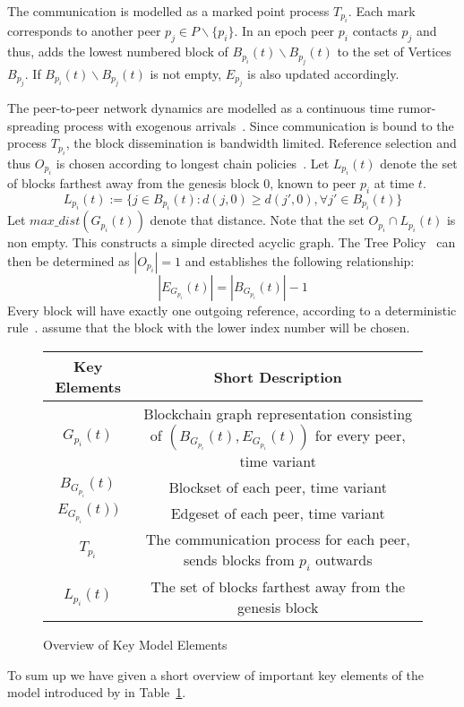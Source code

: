 The communication is modelled as a marked point process $T_{p_i}$.
Each mark corresponds to another peer $p_j \in P\backslash \{p_i\}$.
In an epoch peer $p_i$ contacts $p_j$ and thus, adds the lowest numbered block of $B_{p_i}(t)\backslash B_{p_j}(t)$ to the set of Vertices $B_{p_j}$. If $B_{p_i}(t)\backslash B_{p_j}(t)$ is not empty, $E_{p_j}$ is also updated accordingly.

The peer-to-peer network dynamics are modelled as a continuous time rumor-spreading process with exogenous arrivals~\citep{gopalan}. Since communication is bound to the process $T_{p_i}$, the block dissemination is bandwidth limited.
Reference selection and thus $O_{p_i}$ is chosen according to longest chain policies~\citep{gopalan}.
Let $L_{p_i}(t)$ denote the set of blocks farthest away from the genesis block $0$, known to peer $p_i$ at time $t$.
\begin{equation}
L_{p_i}(t) := \{j \in B_{p_i}(t): d(j,0)\geq d(j',0), \forall j' \in B_{p_i}(t) \}
\label{policy}
\end{equation}
Let $max\_ dist(G_{p_i}(t))$ denote that distance.
Note that the set $O_{p_i} \cap L_{p_i}(t)$ is non empty. This constructs a simple directed acyclic graph. The Tree Policy~\citep{gopalan} can then be determined as $|O_{p_i}|=1$ and establishes the following relationship:
\begin{equation}
|E_{G_{p_i}}(t)| = |B_{G_{p_i}}(t)| -1
\end{equation}
Every block will have exactly one outgoing reference, according to a deterministic rule~\citep{gopalan}. \citeauthor{gopalan} assume that the block with the lower index number will be chosen.

\begin{figure}[t]
\centering
{\renewcommand{\arraystretch}{1.5}
	\begin{tabular}{|c|c|}
	\hline
	\textbf{Key Elements}		&\textbf{Short Description}\\
	\hline
	$G_{p_i}(t)$				& \footnotesize Blockchain graph representation consisting of $(B_{G_{p_i}}(t),E_{G_{p_i}}(t))$ for every peer, time variant\\
	$B_{G_{p_i}}(t)$			& \footnotesize Blockset of each peer, time variant\\
	$E_{G_{p_i}}(t))$			& \footnotesize Edgeset of each peer, time variant \\
	$T_{p_i}$					& \footnotesize The communication process for each peer, sends blocks from $p_i$ outwards\\
	$L_{p_i}(t)$				& \footnotesize The set of blocks farthest away from the genesis block\\
	\hline
	\end{tabular}
}
\caption{Overview of Key Model Elements}
\label{OverviewElements}
\end{figure}
To sum up we have given a short overview of important key elements of the model introduced by \gopalan in Table~\ref{OverviewElements}.

